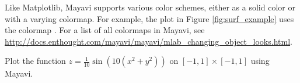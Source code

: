 Like Matplotlib, Mayavi supports various color schemes, either as a solid color or with a varying colormap.
For example, the plot in Figure \ref{fig:surf_example} uses the colormap .
For a list of all colormaps in Mayavi, see \url{http://docs.enthought.com/mayavi/mayavi/mlab_changing_object_looks.html}.

\begin{problem}
Plot the function $z = \frac{1}{10}\sin(10(x^2+y^2))$ on $[-1,1] \times [-1,1]$ using Mayavi.
\end{problem}
